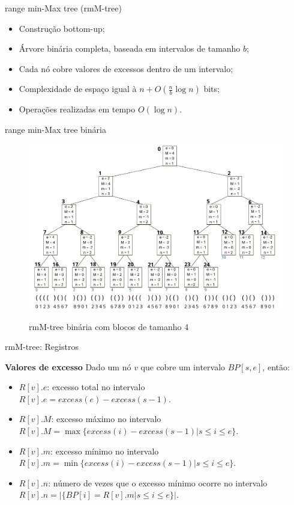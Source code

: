 \begin{frame}{range min-Max tree (rmM-tree)}
    \begin{itemize}
        \item Construção bottom-up;
        \item Árvore binária completa, baseada em intervalos de tamanho $b$;
        \item Cada nó cobre valores de excessos dentro de um intervalo;
        \item Complexidade de espaço igual à $n + O(\frac{n}{b} \log n)$ bits;
        \item Operações realizadas em tempo $O(\log n)$.
    \end{itemize}
\end{frame}

\begin{frame}{range min-Max tree binária}
    \begin{figure}[h!]
        \centering
        \includegraphics[scale=0.3]{images/rmm-tree-bin.png}\\
        \caption{rmM-tree binária com blocos de tamanho 4}
    \end{figure} 
\end{frame}

\begin{frame}{rmM-tree: Registros}

    \textbf{Valores de excesso}
        Dado um nó $v$ que cobre um intervalo $BP[s,e]$, então:
        \begin{itemize}
            \item $R[v].e$: excesso total no intervalo\\
            $R[v].e = excess(e)-excess(s-1)$.
            \item $R[v].M$: excesso máximo no intervalo\\
            $R[v].M = \max\{excess(i) - excess(s - 1) | s \leq i \leq e\}$.
            \item $R[v].m$: excesso mínimo no intervalo\\
            $R[v].m = \min\{excess(i) - excess(s - 1) | s \leq i \leq e\}$.
            \item $R[v].n$: número de vezes que o excesso mínimo ocorre no intervalo\\
            $R[v].n = |\{BP[i]=R[v].m | s \leq i \leq e\}|$.
        \end{itemize}
\end{frame}

